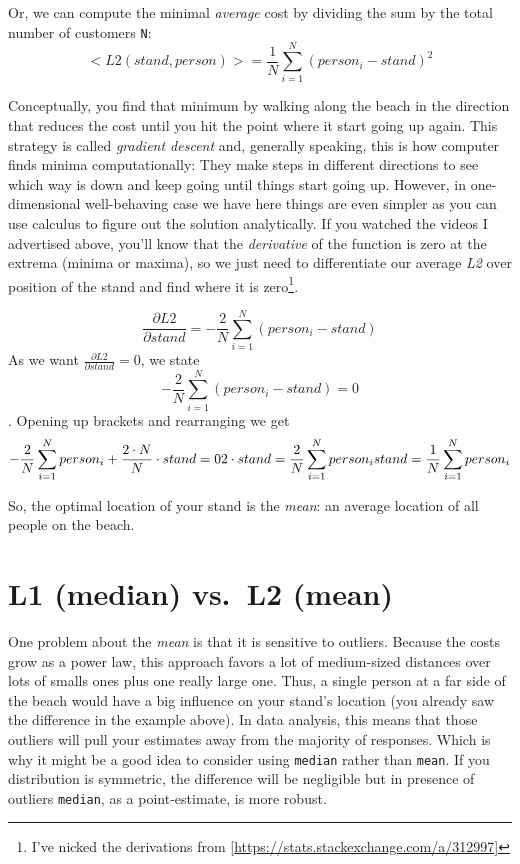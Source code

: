 \documentclass[
]{book}
\begin{document}
Or, we can compute the minimal \emph{average} cost by dividing the sum by the total number of customers \texttt{N}:
\[<L2(stand, person)> = \frac{1}{N}\sum_{i=1}^{N}{(person_i - stand)^2}\]

Conceptually, you find that minimum by walking along the beach in the direction that reduces the cost until you hit the point where it start going up again. This strategy is called \emph{gradient descent} and, generally speaking, this is how computer finds minima computationally: They make steps in different directions to see which way is down and keep going until things start going up. However, in one-dimensional well-behaving case we have here things are even simpler as you can use calculus to figure out the solution analytically. If you watched the videos I advertised above, you'll know that the \emph{derivative} of the function is zero at the extrema (minima or maxima), so we just need to differentiate our average \emph{L2} over position of the stand and find where it is zero\footnote{I've nicked the derivations from {[}\url{https://stats.stackexchange.com/a/312997}{]}}.

\[\frac{\partial L2}{\partial stand} = -\frac{2}{N}\sum_{i=1}^{N}{(person_i - stand)}\]
As we want \(\frac{\partial L2}{\partial stand} = 0\), we state
\[-\frac{2}{N}\sum_{i=1}^{N}{(person_i - stand)} = 0\].
Opening up brackets and rearranging we get
\[-\frac{2}{N}\sum_{i=1}^{N}{person_i} + \frac{2\cdot N}{N}\cdot stand = 0\\
2\cdot stand = \frac{2}{N}\sum_{i=1}^{N}{person_i} \\
stand = \frac{1}{N}\sum_{i=1}^{N}{person_i}
\]

So, the optimal location of your stand is the \emph{mean}: an average location of all people on the beach.

\hypertarget{l1-median-vs.-l2-mean}{%
\section{L1 (median) vs.~L2 (mean)}\label{l1-median-vs.-l2-mean}}

One problem about the \emph{mean} is that it is sensitive to outliers. Because the costs grow as a power law, this approach favors a lot of medium-sized distances over lots of smalls ones plus one really large one. Thus, a single person at a far side of the beach would have a big influence on your stand's location (you already saw the difference in the example above). In data analysis, this means that those outliers will pull your estimates away from the majority of responses. Which is why it might be a good idea to consider using \texttt{median} rather than \texttt{mean}. If you distribution is symmetric, the difference will be negligible but in presence of outliers \texttt{median}, as a point-estimate, is more robust.
\end{document}
